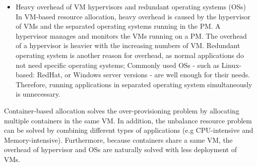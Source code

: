 \begin{itemize}
	\item Heavy overhead of VM hypervisors and redundant operating systems (OSs) \\
	In VM-based resource allocation, heavy overhead is caused by
	the hypervisor of VMs and the separated operating systems running in the PM. A hypervisor manages and monitors the VMs running on a PM. The overhead of a hypervisor is heavier with the increasing numbers of VM. Redundant operating system is another reason for overhead, as normal applications do not need specific operating systems; Commonly used OSs - such as Linux-based: RedHat, or Windows server versions - are well enough for their needs. Therefore, running applications in separated operating system simultaneously is unnecessary.
\end{itemize}


Container-based allocation solves the over-provisioning problem by allocating multiple containers in the same VM. In addition, the unbalance resource problem can be solved by combining different types of applications (e.g CPU-intensive and Memory-intensive). Furthermore, because containers share a same VM, the overhead of hypervisor and OSs are naturally solved with less deployment of VMs.











